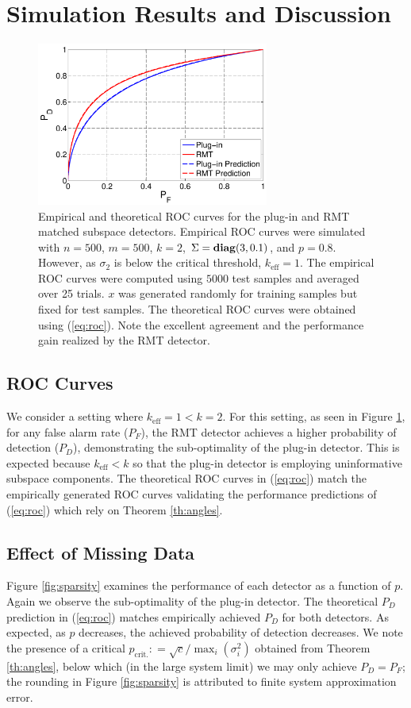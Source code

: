 \section{Simulation Results and Discussion}\label{sec:results}

\begin{figure}[t]
\centering
\includegraphics[width=3in]{figures/basic_roc.pdf}
\caption{Empirical and theoretical ROC curves for the plug-in and RMT matched subspace detectors. Empirical ROC curves were simulated with $n=500$, $m=500$, $k=2$, $\Sigma=\mathop{\bf diag}(3,0.1)$, and $p=0.8$. However, as $\sigma_2$ is below the critical threshold, $k_{\text{eff}} = 1$. The empirical ROC curves were computed using $5000$ test samples and averaged over 25 trials. $x$ was generated randomly for training samples but fixed for test samples. The theoretical ROC curves were obtained using (\ref{eq:roc}). Note the excellent agreement and the performance gain realized by the RMT detector.}\vskip-0.45cm
\label{fig:roc1}
\end{figure}


\subsection{ROC Curves}

We consider a setting where $k_{\text{eff}} = 1 < k = 2$. For this setting, as seen in Figure \ref{fig:roc1}, for any false alarm rate ($P_F$), the RMT detector achieves a higher probability of detection ($P_D$), demonstrating the sub-optimality of the plug-in detector. This is expected because $k_\text{eff}<k$ so that the plug-in detector is employing uninformative subspace components. The theoretical ROC curves in (\ref{eq:roc}) match the empirically generated ROC curves validating the performance predictions of (\ref{eq:roc}) which rely on Theorem \ref{th:angles}.

\subsection{Effect of Missing Data}
Figure \ref{fig:sparsity} examines the performance of each detector as a function of $p$. Again we observe the sub-optimality of the plug-in detector. The theoretical $P_D$ prediction in (\ref{eq:roc}) matches empirically achieved $P_D$ for both detectors. As expected, as $p$ decreases, the achieved probability of detection decreases. We note the presence of a critical $p_{\text{crit.}} : = \sqrt{c}/\max_{i}(\sigma_{i}^{2})$ obtained from Theorem \ref{th:angles}, below which (in the large system limit) we may only achieve $P_D=P_F$; the rounding in Figure \ref{fig:sparsity} is attributed to finite system approximation error.

